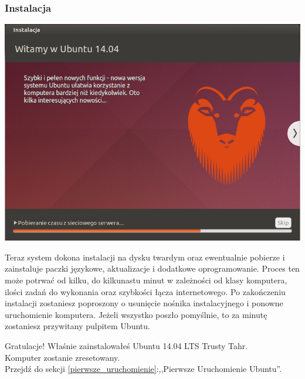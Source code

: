 \subsubsection{Instalacja}
\begin{center}
        \includegraphics[width=\linewidth]{images/instalator_kopiowanie.png}
\end{center}

Teraz system dokona instalacji na dysku twardym oraz ewentualnie pobierze i zainstaluje paczki językowe, aktualizacje i dodatkowe oprogramowanie. Proces ten może potrwać od kilku, do kilkunastu minut w zależności od klasy komputera, ilości zadań do wykonania oraz szybkości łącza internetowego.
Po zakończeniu instalacji zostaniesz poproszony o usunięcie nośnika instalacyjnego i ponowne uruchomienie komputera. Jeżeli wszystko poszło pomyślnie, to za minutę zostaniesz przywitany pulpitem Ubuntu.
\begin{flushright}
\textcolor{ubuntu_orange}{Gratulacje!} Właśnie zainstalowałeś Ubuntu 14.04 LTS Trusty Tahr.\\
Komputer zostanie zresetowany.\\
Przejdź do sekcji \ref{pierwsze_uruchomienie}:,,Pierwsze Uruchomienie Ubuntu''.
\end{flushright}
\clearpage
